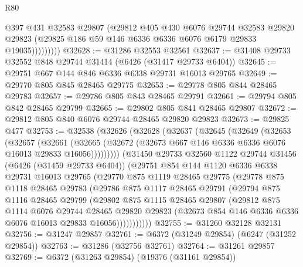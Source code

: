 \begin{lexlean}{R80}
\begin{coremodule}
                  @397
                  @431
                  @32583
                  @29807
                  (@29812
                    @405
                    @430
                    @6076
                    @29744
                    @32583
                    @29820
                    @29823
                    (@29825 @186 @59 @146 @6336 @6336 @6076 @6179 @29833 @19035)))))))))
@32628 := @31286 @32553 @32561
@32637 := @31408 @29733 @32552 @848 @29744 @31414 (@6426 (@31417 @29733 @6404))
@32645 := @29751 @667 @144 @846 @6336 @6338 @29731 @16013 @29765
@32649 := @29770 @805 @845 @28465 @29775
@32653 := @29778 @805 @844 @28465 @29783
@32657 := @29786 @805 @843 @28465 @29791
@32661 := @29794 @805 @842 @28465 @29799
@32665 := @29802 @805 @841 @28465 @29807
@32672 := @29812 @805 @840 @6076 @29744 @28465 @29820 @29823
@32673 := @29825 @477
@32753 := @32538
    (@32626
      (@32628
        (@32637
          (@32645
            (@32649
              (@32653
                (@32657
                  (@32661
                    (@32665
                      (@32672 (@32673 @667 @146 @6336 @6336 @6076 @16013 @29833 @16056)))))))))
        (@31450
          @29733
          @32560
          @1122
          @29744
          @31456
          (@6426 (@31459 @29733 @6404))
          (@29751
            @854
            @144
            @1120
            @6336
            @6338
            @29731
            @16013
            @29765
            (@29770
              @875
              @1119
              @28465
              @29775
              (@29778
                @875
                @1118
                @28465
                @29783
                (@29786
                  @875
                  @1117
                  @28465
                  @29791
                  (@29794
                    @875
                    @1116
                    @28465
                    @29799
                    (@29802
                      @875
                      @1115
                      @28465
                      @29807
                      (@29812
                        @875
                        @1114
                        @6076
                        @29744
                        @28465
                        @29820
                        @29823
                        (@32673 @854 @146 @6336 @6336 @6076 @16013 @29833 @16056)))))))))))
@32755 := @31260 @32128 @32131
@32756 := @31247 @29857
@32761 := @6372 (@31249 @29854) (@6247 (@31252 @29854))
@32763 := @31286 (@32756 @32761)
@32764 := @31261 @29857
@32769 := @6372 (@31263 @29854) (@19376 (@31161 @29854))

\end{coremodule}
\end{lexlean}
